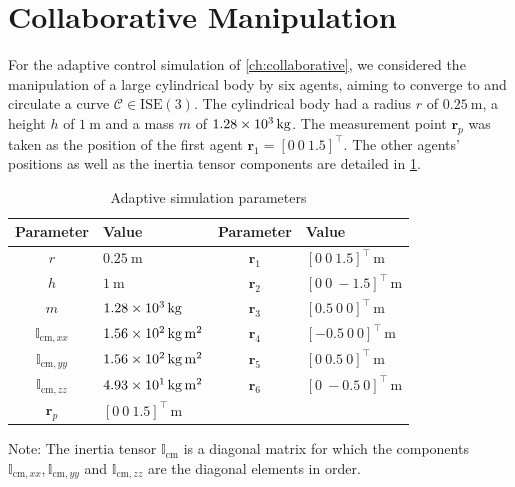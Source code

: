 \section{Collaborative Manipulation}
For the adaptive control simulation of \cref{ch:collaborative}, we considered the manipulation of a large cylindrical body by six agents, aiming to converge to and circulate a curve $\mathcal{C}\in\text{ISE}(3)$. The cylindrical body had a radius $r$ of $\qty{0.25}{\meter}$, a height $h$ of $\qty{1}{\meter}$ and a mass $m$ of $\qty{1.28E3}{\kilogram}$. The measurement point $\mathbf{r}_p$ was taken as the position of the first agent $\mathbf{r}_1=[0\ 0\ 1.5]^\top$. The other agents' positions as well as the inertia tensor components are detailed in \cref{tb:parameters}.
\begin{table}[htb]
    \centering
    \begin{threeparttable}
    \caption{Adaptive simulation parameters}\label{tb:parameters}
    \begin{tabular}{clcl}
    Parameter & Value & Parameter & Value\\\hline
    $r$ & $\qty{0.25}{\meter}$ & $\mathbf{r}_{1}$ & $[0\ 0\ 1.5]^\top\,\unit{\meter}$\\
    $h$ & $\qty{1}{\meter}$ & $\mathbf{r}_{2}$ & $[0\ 0\ -1.5]^\top\,\unit{\meter}$\\
    $m$ & $\qty{1.28E3}{\kilogram}$ & 
    $\mathbf{r}_{3}$ & $[0.5\ 0\ 0]^\top\,\unit{\meter}$\\
    $\mathbb{I}_{\text{cm}, xx}$ & $\qty{1.56E2}{\kilogram\meter\squared}$ & 
    $\mathbf{r}_{4}$ & $[-0.5\ 0\ 0]^\top\,\unit{\meter}$\\  
    $\mathbb{I}_{\text{cm}, yy}$ & $\qty{1.56E2}{\kilogram\meter\squared}$ &
    $\mathbf{r}_{5}$ & $[0\ 0.5\ 0]^\top\,\unit{\meter}$\\
    $\mathbb{I}_{\text{cm}, zz}$ & $\qty{4.93E1}{\kilogram\meter\squared}$  & 
    $\mathbf{r}_{6}$ & $[0\ -0.5 \ 0]^\top\,\unit{\meter}$\\
    $\mathbf{r}_{p}$ & $[0\ 0\ 1.5]^\top\,\unit{\meter}$ \\\hline
    \end{tabular}
    \begin{tablenotes}
        \footnotesize
        \item Note: The inertia tensor $\mathbb{I}_\text{cm}$ is a diagonal matrix for which the components $\mathbb{I}_{\text{cm}, xx}, \mathbb{I}_{\text{cm}, yy}$ and $\mathbb{I}_{\text{cm}, zz}$ are the diagonal elements in order.
    \end{tablenotes}
    \end{threeparttable}
\end{table}

